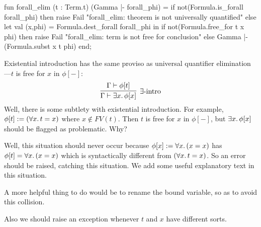 \nwenddocs{}\plusendmoddef\nwstartdeflinemarkup{}\nwenddeflinemarkup
fun forall_elim (t : Term.t) (Gamma |- forall_phi) =
  if not(Formula.is_forall forall_phi)
  then raise Fail "forall_elim: theorem is not universally quantified"
  else let val (x,phi) = Formula.dest_forall forall_phi
       in if not(Formula.free_for t x phi)
          then raise Fail "forall_elim: term is not free for conclusion"
          else Gamma |- (Formula.subst x t phi)
       end;
\eatline
{}\nwendcode{}\nwdocspar
\begin{node}\label{node:kernel.nw:existential-introduction}
Existential introduction has the same proviso as universal quantifier
elimination---$t$ is free for $x$ in $\phi[-]$:
\begin{equation}
\vcenter{\infer[\exists\mbox{-intro}]{\Gamma\vdash\exists x\ldotp\phi[x]}{\Gamma\vdash\phi[t]}}
\end{equation}
Well, there is some subtlety with existential introduction. For
example, $\phi[t]:=(\forall x\ldotp t=x)$ where $x\notin FV(t)$. Then
$t$ is free for $x$ in $\phi[-]$, but $\exists x\ldotp\phi[x]$ should
be flagged as problematic. Why?

Well, this situation should never occur because $\phi[x]:=\forall x\ldotp(x=x)$
has $\phi[t]=\forall x\ldotp(x=x)$ which is syntactically different
from $(\forall x\ldotp t=x)$. So an error should be raised, catching
this situation. We add some useful explanatory text in this situation.

A more helpful thing to do would be to rename the bound variable, so
as to avoid this collision.

Also we should raise an exception whenever $t$ and $x$ have different
sorts.
\end{node}

